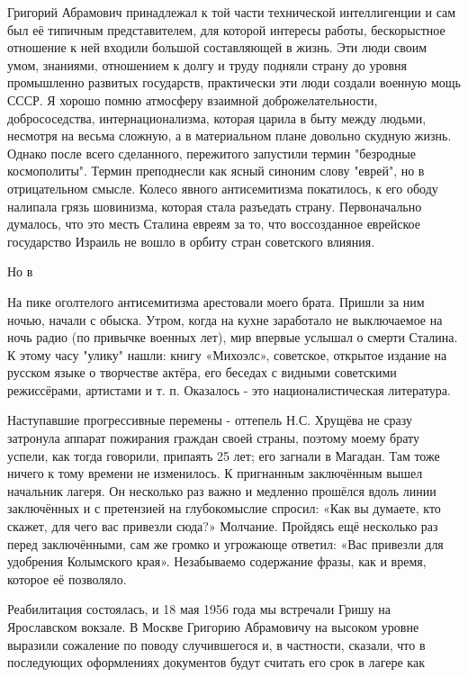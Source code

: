 Григорий Абрамович принадлежал к той части технической интеллигенции и сам был её типичным представителем, для которой интересы работы, бескорыстное отношение к ней входили большой составляющей в жизнь. Эти люди своим умом, знаниями, отношением к долгу и труду подняли страну до уровня промышленно развитых государств, практически эти люди создали военную мощь СССР. Я хорошо помню атмосферу взаимной доброжелательности, добрососедства, интернационализма, которая царила в быту между людьми, несмотря на весьма сложную, а в материальном плане довольно скудную жизнь. Однако после всего сделанного, пережитого запустили термин "безродные космополиты". Термин преподнесли как ясный синоним слову "еврей", но в отрицательном смысле. Колесо явного антисемитизма покатилось, к его ободу налипала грязь шовинизма, которая стала разъедать страну. Первоначально думалось, что это месть Сталина евреям за то, что воссозданное еврейское государство Израиль не вошло в орбиту стран советского влияния.

Но в

\label{169-1}
На пике оголтелого антисемитизма арестовали моего брата. Пришли за ним ночью, начали с обыска. Утром, когда на кухне заработало не выключаемое на ночь радио (по привычке военных лет), мир впервые услышал о смерти Сталина. К этому часу "улику" нашли: книгу «Михоэлс», советское, открытое издание на русском языке о творчестве актёра, его беседах с видными советскими режиссёрами, артистами и т. п. Оказалось - это националистическая литература.

Наступавшие прогрессивные перемены - оттепель Н.С. Хрущёва не сразу затронула аппарат пожирания граждан своей страны, поэтому моему брату успели, как тогда говорили, припаять 25 лет; его загнали в Магадан. Там тоже ничего к тому времени не изменилось. К пригнанным заключённым вышел начальник лагеря. Он несколько раз важно и медленно прошёлся вдоль линии заключённых и с претензией на глубокомыслие спросил: «Как вы думаете, кто скажет, для чего вас привезли сюда?» Молчание. Пройдясь ещё несколько раз перед заключёнными, сам же громко и угрожающе ответил: «Вас привезли для удобрения Колымского края». Незабываемо содержание фразы, как и время, которое её позволяло.

Реабилитация состоялась, и 18 мая 1956 года мы встречали Гришу на Ярославском вокзале. В Москве Григорию Абрамовичу на высоком уровне выразили сожаление по поводу случившегося и, в частности, сказали, что в последующих оформлениях документов будут считать его срок в лагере как 

